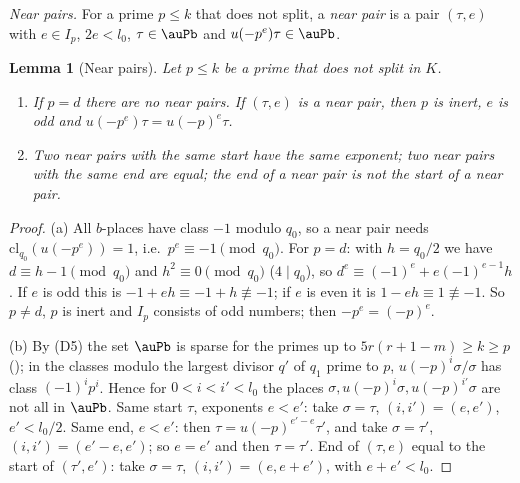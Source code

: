 \documentclass[10pt]{amsart}
\newtheorem{lemma}[theorem]{Lemma}
\theoremstyle{definition}
\theoremstyle{remark}
\providecommand{\ancl}{\mathrm{cl}}
\begin{document}
\emph{Near pairs.} For a prime $p\le k$ that does not split, a \emph{near pair} is a pair $(\tau,e)$
with $e\in I_p$, $2e<l_0$, $\tau\in\auPb$ and $u(-p^e)\tau\in\auPb$.

\begin{lemma}[Near pairs]\label{psm:near}
Let $p\le k$ be a prime that does not split in $K$.
\begin{enumerate}
\item[(a)] If $p=d$ there are no near pairs. If $(\tau,e)$ is a near pair, then $p$ is inert, $e$ is
odd and $u(-p^e)\tau=u(-p)^e\tau$.
\item[(b)] Two near pairs with the same start have the same exponent; two near pairs with the same
end are equal; the end of a near pair is not the start of a near pair.
\end{enumerate}
\end{lemma}
\begin{proof}
(a) All $b$-places have class $-1$ modulo $q_0$, so a near pair needs $\ancl_{q_0}(u(-p^e))=1$,
i.e.\ $p^e\equiv-1\pmod{q_0}$. For $p=d$: with $h=q_0/2$ we have $d\equiv h-1\pmod{q_0}$ and
$h^2\equiv0\pmod{q_0}$ ($4\mid q_0$), so $d^e\equiv(-1)^e+e(-1)^{e-1}h$. If $e$ is odd this is
$-1+eh\equiv-1+h\not\equiv-1$; if $e$ is even it is $1-eh\equiv1\not\equiv-1$. So $p\ne d$, $p$ is
inert and $I_p$ consists of odd numbers; then $-p^e=(-p)^e$.

(b) By (D5) the set $\auPb$ is sparse for the primes up to $5r(r+1-m)\ge k\ge p$
({\cite[Definition~13.2]{P46}}); in the classes modulo the largest divisor $q'$ of $q_1$ prime to
$p$, $u(-p)^i\sigma/\sigma$ has class $(-1)^ip^i$. Hence for $0<i<i'<l_0$ the places
$\sigma,u(-p)^i\sigma,u(-p)^{i'}\sigma$ are not all in $\auPb$. Same start $\tau$, exponents
$e<e'$: take $\sigma=\tau$, $(i,i')=(e,e')$, $e'<l_0/2$. Same end, $e<e'$: then $\tau=u(-p)^{e'-e}
\tau'$, and take $\sigma=\tau'$, $(i,i')=(e'-e,e')$; so $e=e'$ and then $\tau=\tau'$. End of
$(\tau,e)$ equal to the start of $(\tau',e')$: take $\sigma=\tau$, $(i,i')=(e,e+e')$, with
$e+e'<l_0$.
\end{proof}
\end{document}

